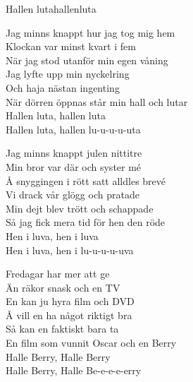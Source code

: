 \begin{song}{Hallen luta}{hallenluta}
\begin{vers}
Jag minns knappt hur jag tog mig hem\\
Klockan var minst kvart i fem\\
När jag stod utanför min egen våning\\
Jag lyfte upp min nyckelring\\
Och haja nästan ingenting\\
När dörren öppnas står min hall och lutar\\
Hallen luta, hallen luta\\
Hallen luta, hallen lu-u-u-u-uta\\
\end{vers}
\begin{vers}
Jag minns knappt julen nittitre\\
Min bror var där och syster mé\\
Å snyggingen i rött satt alldles brevé\\
Vi drack vår glögg och pratade\\
Min dejt blev trött och schappade\\
Så jag fick mera tid för hen den röde\\
Hen i luva, hen i luva\\
Hen i luva, hen i lu-u-u-u-uva\\
\end{vers}
\begin{vers}
Fredagar har mer att ge\\
Än räkor snask och en TV\\
En kan ju hyra film och DVD\\
Å vill en ha något riktigt bra\\
Så kan en faktiskt bara ta\\
En film som vunnit Oscar och en Berry\\
Halle Berry, Halle Berry\\
Halle Berry, Halle Be-e-e-e-erry\\
\end{vers}
\end{song}
